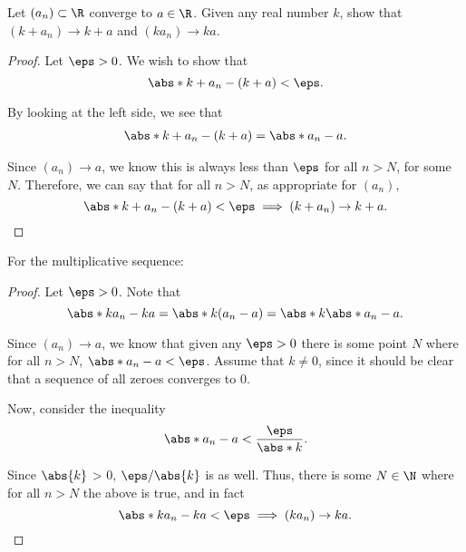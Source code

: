 \setcounter{enumi}{1} %
\item Let $(a_{n}) \subset \R$ converge to $a \in \R$.
    Given any real number $k$, show that $(k + a_{n}) \to k + a$ and $(ka_{n}) \to ka$.

    \begin{proof}
        Let $\eps > 0$. We wish to show that
        \[
        \abs*{k + a_{n} - (k + a)} < \eps.
        \]

        By looking at the left side, we see that
        \begin{align*}
        \abs*{k + a_{n} - (k + a)} = \abs*{a_{n} - a}.
        \end{align*}

        Since $(a_{n}) \to a$, we know this is always less than $\eps$ for all $n > N$, for some $N$.
        Therefore, we can say that for all $n > N$, as appropriate for $(a_{n})$,
        \[
        \abs*{k + a_{n} - (k + a)} < \eps \implies (k + a_{n}) \to k + a.
        \]
    \end{proof}

    For the multiplicative sequence:
    \begin{proof}
        Let $\eps > 0$. Note that
        \[
        \abs*{ka_{n} - ka} = \abs*{k(a_{n} - a)} = \abs*{k}\abs*{a_{n} - a}.
        \]

        Since $(a_{n}) \to a$, we know that given any $\eps > 0$ there is some point $N$
        where for all $n > N$, $\abs*{a_{n} - a} < \eps$. Assume that $k \ne 0$, since it should be clear
        that a sequence of all zeroes converges to 0.

        Now, consider the inequality
        \[
        \abs*{a_{n} - a} < \dfrac{\eps}{\abs*{k}}.
        \]

        Since $\abs{k}$ > 0, $\eps/\abs{k}$ is as well. Thus, there is some $N \in \N$ where for all $n > N$
        the above is true, and in fact
        \[
        \abs*{ka_{n} - ka} < \eps \implies (ka_{n}) \to ka.
        \]
    \end{proof}

